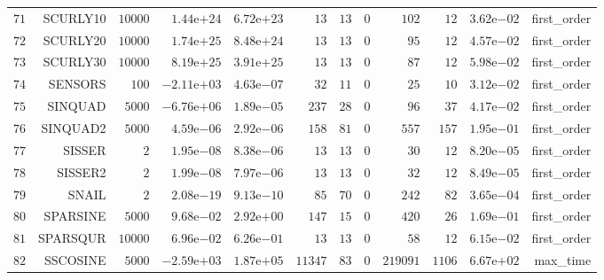\begin{longtable}{rrrrrrrrrrrr}
  \(    71\) & SCURLY10 & \( 10000\) & \( 1.44\)e\(+24\) & \( 6.72\)e\(+23\) & \(    13\) & \(    13\) & \(     0\) & \(   102\) & \(    12\) & \( 3.62\)e\(-02\) & first\_order \\
  \(    72\) & SCURLY20 & \( 10000\) & \( 1.74\)e\(+25\) & \( 8.48\)e\(+24\) & \(    13\) & \(    13\) & \(     0\) & \(    95\) & \(    12\) & \( 4.57\)e\(-02\) & first\_order \\
  \(    73\) & SCURLY30 & \( 10000\) & \( 8.19\)e\(+25\) & \( 3.91\)e\(+25\) & \(    13\) & \(    13\) & \(     0\) & \(    87\) & \(    12\) & \( 5.98\)e\(-02\) & first\_order \\
  \(    74\) & SENSORS & \(   100\) & \(-2.11\)e\(+03\) & \( 4.63\)e\(-07\) & \(    32\) & \(    11\) & \(     0\) & \(    25\) & \(    10\) & \( 3.12\)e\(-02\) & first\_order \\
  \(    75\) & SINQUAD & \(  5000\) & \(-6.76\)e\(+06\) & \( 1.89\)e\(-05\) & \(   237\) & \(    28\) & \(     0\) & \(    96\) & \(    37\) & \( 4.17\)e\(-02\) & first\_order \\
  \(    76\) & SINQUAD2 & \(  5000\) & \( 4.59\)e\(-06\) & \( 2.92\)e\(-06\) & \(   158\) & \(    81\) & \(     0\) & \(   557\) & \(   157\) & \( 1.95\)e\(-01\) & first\_order \\
  \(    77\) & SISSER & \(     2\) & \( 1.95\)e\(-08\) & \( 8.38\)e\(-06\) & \(    13\) & \(    13\) & \(     0\) & \(    30\) & \(    12\) & \( 8.20\)e\(-05\) & first\_order \\
  \(    78\) & SISSER2 & \(     2\) & \( 1.99\)e\(-08\) & \( 7.97\)e\(-06\) & \(    13\) & \(    13\) & \(     0\) & \(    32\) & \(    12\) & \( 8.49\)e\(-05\) & first\_order \\
  \(    79\) & SNAIL & \(     2\) & \( 2.08\)e\(-19\) & \( 9.13\)e\(-10\) & \(    85\) & \(    70\) & \(     0\) & \(   242\) & \(    82\) & \( 3.65\)e\(-04\) & first\_order \\
  \(    80\) & SPARSINE & \(  5000\) & \( 9.68\)e\(-02\) & \( 2.92\)e\(+00\) & \(   147\) & \(    15\) & \(     0\) & \(   420\) & \(    26\) & \( 1.69\)e\(-01\) & first\_order \\
  \(    81\) & SPARSQUR & \( 10000\) & \( 6.96\)e\(-02\) & \( 6.26\)e\(-01\) & \(    13\) & \(    13\) & \(     0\) & \(    58\) & \(    12\) & \( 6.15\)e\(-02\) & first\_order \\
  \(    82\) & SSCOSINE & \(  5000\) & \(-2.59\)e\(+03\) & \( 1.87\)e\(+05\) & \( 11347\) & \(    83\) & \(     0\) & \(219091\) & \(  1106\) & \( 6.67\)e\(+02\) & max\_time \\

\end{longtable}
